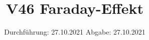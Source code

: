 

\subject{Fortgeschrittenenpraktikum}
\title{V46 Faraday-Effekt}
\date{%
  Durchführung: 27.10.2021
  \hspace{3em}
  Abgabe: 27.10.2021
}



\maketitle
\thispagestyle{empty}
\tableofcontents
\newpage








\printbibliography{}




